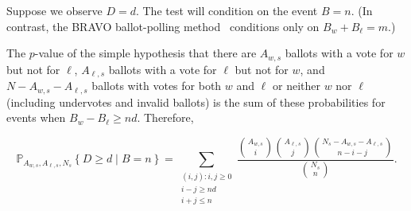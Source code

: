 Suppose we observe $D=d$.
The test will condition on the event $B=n$. 
(In contrast, the BRAVO ballot-polling
method~\citep{lindemanEtal12}
conditions only on $B_w+B_\ell = m$.)

The $p$-value of the simple hypothesis that there are $A_{w,s}$ ballots with
a vote for $w$ but not for $\ell$, $A_{\ell,s}$ ballots with a vote for $\ell$ but not for $w$, 
and $N - A_{w,s} - A_{\ell,s}$ ballots with votes for both $w$ and $\ell$ or neither $w$ nor $\ell$ 
(including undervotes and
invalid ballots) is the sum of these probabilities for events when $B_w - B_\ell \geq nd$.
Therefore,

\begin{equation}
   \mathbb{P}_{A_{w,s}, A_{\ell,s}, N_s} \left \{ D \geq d \;\vert\; B = n\right \} = 
   \sum_{\substack{(i, j) :  i, j\ge 0 \\ i-j \geq nd \\ i+j \leq n}} \frac{ {A_{w,s } \choose i}{A_{\ell,s} \choose j}{N_s - A_{w,s} - A_{\ell,s} \choose n-i-j}}{{N_s \choose n}}.
\end{equation}


